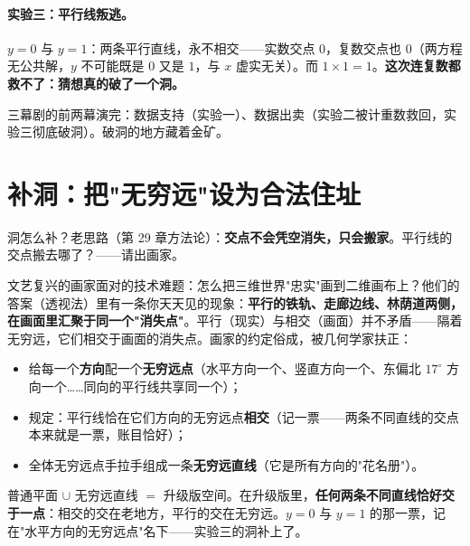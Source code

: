\paragraph{实验三：平行线叛逃。}$y = 0$ 与 $y = 1$：两条平行直线，永不相交——实数交点 $0$，复数交点也 $0$（两方程无公共解，$y$ 不可能既是 $0$ 又是 $1$，与 $x$ 虚实无关）。而 $1\times1 = 1$。\textbf{这次连复数都救不了：猜想真的破了一个洞。}

三幕剧的前两幕演完：数据支持（实验一）、数据出卖（实验二被计重数救回，实验三彻底破洞）。破洞的地方藏着金矿。

\section{补洞：把"无穷远"设为合法住址}

洞怎么补？老思路（第 29 章方法论）：\textbf{交点不会凭空消失，只会搬家}。平行线的交点搬去哪了？——请出画家。

文艺复兴的画家面对的技术难题：怎么把三维世界"忠实"画到二维画布上？他们的答案（透视法）里有一条你天天见的现象：\textbf{平行的铁轨、走廊边线、林荫道两侧，在画面里汇聚于同一个"消失点"}。平行（现实）与相交（画面）并不矛盾——隔着无穷远，它们相交于画面的消失点。画家的约定俗成，被几何学家扶正：

\begin{itemize}
\item 给每一个\textbf{方向}配一个\textbf{无穷远点}（水平方向一个、竖直方向一个、东偏北 $17^\circ$ 方向一个……同向的平行线共享同一个）；
\item 规定：平行线恰在它们方向的无穷远点\textbf{相交}（记一票——两条不同直线的交点本来就是一票，账目恰好）；
\item 全体无穷远点手拉手组成一条\textbf{无穷远直线}（它是所有方向的"花名册"）。
\end{itemize}


普通平面 $\cup$ 无穷远直线 $=$ 升级版空间。在升级版里，\textbf{任何两条不同直线恰好交于一点}：相交的交在老地方，平行的交在无穷远。$y=0$ 与 $y=1$ 的那一票，记在"水平方向的无穷远点"名下——实验三的洞补上了。

